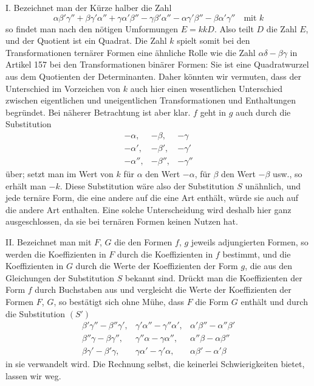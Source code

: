 I. Bezeichnet man der Kürze halber die Zahl
\[
\alpha\beta'\gamma''+\beta\gamma'\alpha''+\gamma\alpha'\beta''
-\gamma\beta'\alpha''-\alpha\gamma'\beta''-\beta\alpha'\gamma''\quad\text{mit }k
\]
so findet man nach den nötigen Umformungen $E=kkD$. Also teilt $D$ die Zahl $E$, und der Quotient ist ein Quadrat. Die Zahl $k$ spielt somit bei den Transformationen ternärer Formen eine ähnliche Rolle wie die Zahl $\alpha\delta-\beta\gamma$ in Artikel 157 bei den Transformationen binärer Formen: Sie ist eine Quadratwurzel aus dem Quotienten der Determinanten. Daher könnten wir vermuten, dass der Unterschied im Vorzeichen von $k$ auch hier einen wesentlichen Unterschied zwischen eigentlichen und uneigentlichen Transformationen und Enthaltungen begründet. Bei näherer Betrachtung ist aber klar. $f$ geht in $g$ auch durch die Substitution
\[
\begin{array}{ccc}
-\alpha, & -\beta, & -\gamma \\
-\alpha', & -\beta', & -\gamma' \\
-\alpha'', & -\beta'', & -\gamma''
\end{array}
\]
über; setzt man im Wert von $k$ für $\alpha$ den Wert $-\alpha$, für $\beta$ den Wert $-\beta$ usw., so erhält man $-k$. Diese Substitution wäre also der Substitution $S$ unähnlich, und jede ternäre Form, die eine andere auf die eine Art enthält, würde sie auch auf die andere Art enthalten. Eine solche Unterscheidung wird deshalb hier ganz ausgeschlossen, da sie bei ternären Formen keinen Nutzen hat.

II. Bezeichnet man mit $F$, $G$ die den Formen $f$, $g$ jeweils adjungierten Formen, so werden die Koeffizienten in $F$ durch die Koeffizienten in $f$ bestimmt, und die Koeffizienten in $G$ durch die Werte der Koeffizienten der Form $g$, die aus den Gleichungen der Substitution $S$ bekannt sind. Drückt man die Koeffizienten der Form $f$ durch Buchstaben aus und vergleicht die Werte der Koeffizienten der Formen $F$, $G$, so bestätigt sich ohne Mühe, dass $F$ die Form $G$ enthält und durch die Substitution
$(S')$
\[
\begin{array}{ccc}
\beta'\gamma''-\beta''\gamma', & \gamma'\alpha''-\gamma''\alpha', & \alpha'\beta''-\alpha''\beta' \\
\beta''\gamma-\beta\gamma'', & \gamma''\alpha-\gamma\alpha'', & \alpha''\beta-\alpha\beta'' \\
\beta\gamma'-\beta'\gamma, & \gamma\alpha'-\gamma'\alpha, & \alpha\beta'-\alpha'\beta
\end{array}
\]
in sie verwandelt wird. Die Rechnung selbst, die keinerlei Schwierigkeiten bietet, lassen wir weg.

